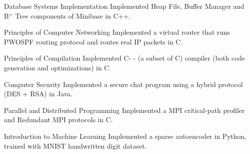 

\begin{cvskills}

  \cvcourse
    {Database Systems Implementation} %
    {Implemented Heap File, Buffer Manager and B$^+$ Tree components of
    Minibase in C++.} %

  \cvcourse
    {Principles of Computer Networking} %
    {Implemented a virtual router that runs PWOSPF routing protocol
    and routes real IP packets in C.} %

  \cvcourse
    {Principles of Compilation} %
    {Implemented C- - (a subset of C) compiler (both code generation
    and optimizations) in C.}

  \cvcourse
    {Computer Security} %
    {Implemented a secure chat program using a hybrid protocol (DES + RSA) in Java.}

  \cvcourse
    {Parallel and Distributed Programming} %
    {Implemented a MPI critical-path profiler and Redundant MPI protocols in C.}

  \cvcourse
    {Introduction to Machine Learning} %
    {Implemented a sparse autoencoder in Python, trained with MNIST
    handwritten digit dataset.}

\end{cvskills}


